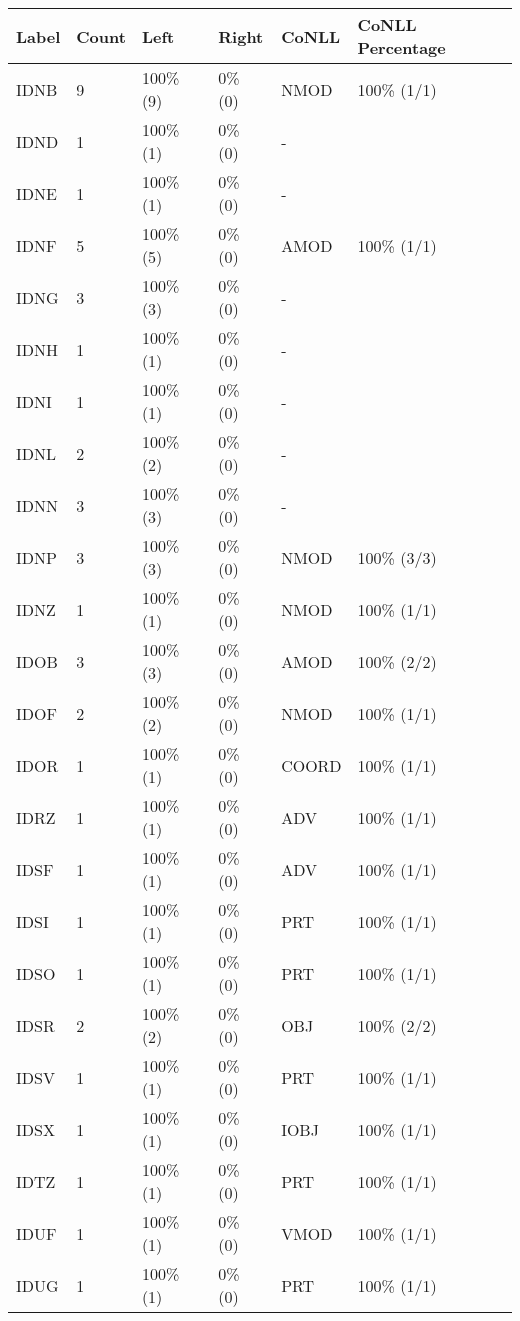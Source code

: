 \begin{figure*}
\begin{tabular}{|l|l|l|l||l|l|}
\hline
Label & Count & Left & Right & CoNLL & CoNLL Percentage\\ 
\hline
 IDNB & 9 & 100\% (9) & 0\% (0) & NMOD & 100\% (1/1) \\ 
\hline
 IDND & 1 & 100\% (1) & 0\% (0) & - &  \\ 
\hline
 IDNE & 1 & 100\% (1) & 0\% (0) & - &  \\ 
\hline
 IDNF & 5 & 100\% (5) & 0\% (0) & AMOD & 100\% (1/1) \\ 
\hline
 IDNG & 3 & 100\% (3) & 0\% (0) & - &  \\ 
\hline
 IDNH & 1 & 100\% (1) & 0\% (0) & - &  \\ 
\hline
 IDNI & 1 & 100\% (1) & 0\% (0) & - &  \\ 
\hline
 IDNL & 2 & 100\% (2) & 0\% (0) & - &  \\ 
\hline
 IDNN & 3 & 100\% (3) & 0\% (0) & - &  \\ 
\hline
 IDNP & 3 & 100\% (3) & 0\% (0) & NMOD & 100\% (3/3) \\ 
\hline
 IDNZ & 1 & 100\% (1) & 0\% (0) & NMOD & 100\% (1/1) \\ 
\hline
 IDOB & 3 & 100\% (3) & 0\% (0) & AMOD & 100\% (2/2) \\ 
\hline
 IDOF & 2 & 100\% (2) & 0\% (0) & NMOD & 100\% (1/1) \\ 
\hline
 IDOR & 1 & 100\% (1) & 0\% (0) & COORD & 100\% (1/1) \\ 
\hline
 IDRZ & 1 & 100\% (1) & 0\% (0) & ADV & 100\% (1/1) \\ 
\hline
 IDSF & 1 & 100\% (1) & 0\% (0) & ADV & 100\% (1/1) \\ 
\hline
 IDSI & 1 & 100\% (1) & 0\% (0) & PRT & 100\% (1/1) \\ 
\hline
 IDSO & 1 & 100\% (1) & 0\% (0) & PRT & 100\% (1/1) \\ 
\hline
 IDSR & 2 & 100\% (2) & 0\% (0) & OBJ & 100\% (2/2) \\ 
\hline
 IDSV & 1 & 100\% (1) & 0\% (0) & PRT & 100\% (1/1) \\ 
\hline
 IDSX & 1 & 100\% (1) & 0\% (0) & IOBJ & 100\% (1/1) \\ 
\hline
 IDTZ & 1 & 100\% (1) & 0\% (0) & PRT & 100\% (1/1) \\ 
\hline
 IDUF & 1 & 100\% (1) & 0\% (0) & VMOD & 100\% (1/1) \\ 
\hline
 IDUG & 1 & 100\% (1) & 0\% (0) & PRT & 100\% (1/1) \\ 

\end{tabular}
\end{figure*}
